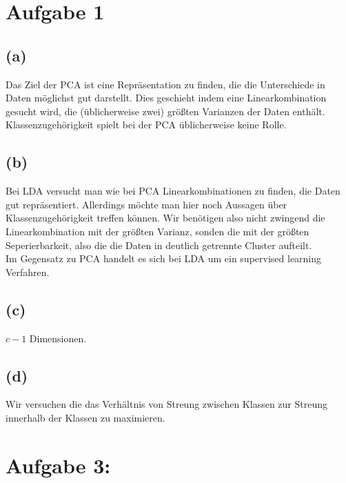 \documentclass[a4paper]{scrartcl}
\begin{document}
\section*{Aufgabe 1}
\subsection*{(a)}
Das Ziel der PCA ist eine Repräsentation zu finden, die die Unterschiede in Daten möglichst gut darstellt. Dies geschieht indem eine Linearkombination gesucht wird, die (üblicherweise zwei) größten Varianzen der Daten enthält.\\
Klassenzugehörigkeit spielt bei der PCA üblicherweise keine Rolle. %



\subsection*{(b)}
Bei LDA versucht man wie bei PCA Linearkombinationen zu finden, die Daten gut repräsentiert. Allerdings möchte man hier noch Aussagen über Klassenzugehörigkeit treffen können. Wir benötigen also nicht zwingend die Linearkombination mit der größten Varianz, sonden die mit der größten Seperierbarkeit, also die die Daten in deutlich getrennte Cluster aufteilt.\\
Im Gegensatz zu PCA handelt es sich bei LDA um ein supervised learning Verfahren.



\subsection*{(c)}
$c-1$ Dimensionen.





\subsection*{(d)}
Wir versuchen die das Verhältnis von Streung zwischen Klassen zur Streung innerhalb der Klassen zu maximieren.



\section*{Aufgabe 3:}
\end{document}
